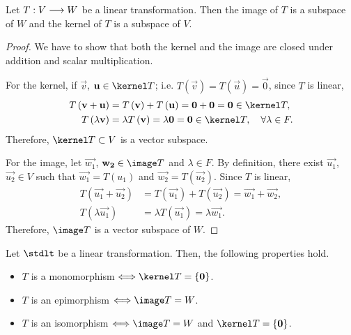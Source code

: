 \begin{prop}
    Let $T : V\longrightarrow W$ be a linear transformation. Then the image of $T$ is a subspace of $W$ and the
    kernel of $T$ is a subspace of $V$.
\end{prop}

\begin{proof}
    We have to show that both the kernel and the image are closed under addition and scalar multiplication.

    For the kernel, if $\vec{v}$, $\vec{u}\in\kernel T$; i.e. $T\left( \vec{v} \right) = T\left( \vec{u}
    \right) = \vec{0}$, since $T$ is linear,
    \begin{align}
        T\left( \vec{v} + \vec{u} \right) &= T\left( \vec{v} \right) + T\left( \vec{u} \right) = \vec{0} +
        \vec{0} = \vec{0}\in\kernel T, \\
        T\left( \lambda\vec{v} \right) &= \lambda T\left( \vec{v} \right) = \lambda\vec{0} = \vec{0}\in\kernel
        T, \quad \forall\lambda\in F.
    \end{align}
    Therefore, $\kernel T\subset V$ is a vector subspace.

    For the image, let $\vec{w_1}$, $\vec{w_2}\in\image T$ and $\lambda\in F$. By definition, there exist
    $\vec{u_1}$, $\vec{u_2}\in V$ such that $\vec{w_1} = T\left( u_1 \right) $ and $\vec{w_2} = T\left(
    \vec{u_2} \right) $. Since $T$ is linear,
    \begin{align}
        T\left( \vec{u_1} + \vec{u_2} \right) &= T\left( \vec{u_1} \right) + T\left( \vec{u_2} \right) =
        \vec{w_1} + \vec{w_2}, \\
        T\left( \lambda\vec{u_1} \right) &= \lambda T\left( \vec{u_1} \right) = \lambda\vec{w_1}.
    \end{align}
    Therefore, $\image T$ is a vector subspace of $W$.
\end{proof}

\begin{prop}
    Let $\stdlt$ be a linear transformation. Then, the following properties hold.
    \begin{itemize}[itemsep = -2pt]
        \item $T$ is a monomorphism $\iff\kernel T = \{\vec{0}\}$.
        \item $T$ is an epimorphism $\iff\image T = W$.
        \item $T$ is an isomorphism $\iff\image T = W$ and $\kernel T = \{\vec{0}\}$.
    \end{itemize}
\end{prop}

